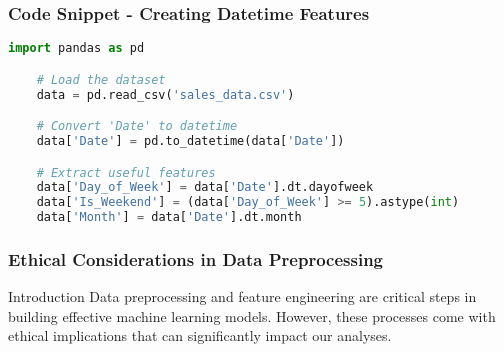 \documentclass[aspectratio=169]{beamer}
\begin{document}
\begin{frame}[fragile]
    \frametitle{Code Snippet - Creating Datetime Features}
    \begin{lstlisting}[language=Python]
    import pandas as pd

    # Load the dataset
    data = pd.read_csv('sales_data.csv')

    # Convert 'Date' to datetime
    data['Date'] = pd.to_datetime(data['Date'])

    # Extract useful features
    data['Day_of_Week'] = data['Date'].dt.dayofweek
    data['Is_Weekend'] = (data['Day_of_Week'] >= 5).astype(int)
    data['Month'] = data['Date'].dt.month
    \end{lstlisting}
\end{frame}

\begin{frame}
    \frametitle{Ethical Considerations in Data Preprocessing}
    \begin{block}{Introduction}
        Data preprocessing and feature engineering are critical steps in building effective machine learning models. However, these processes come with ethical implications that can significantly impact our analyses. 
    \end{block}
\end{frame}
\end{document}

